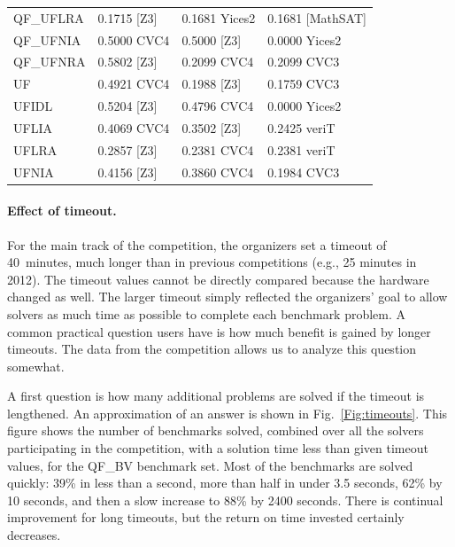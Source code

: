\documentclass[twoside,11pt]{article}
\begin{document}
\begin{table}
\begin{tabular}{|l|lll|}
QF\_UFLRA & 0.1715 [Z3] & 0.1681 Yices2 & 0.1681 [MathSAT] \\
QF\_UFNIA & 0.5000 CVC4 & 0.5000 [Z3] & 0.0000 Yices2 \\
QF\_UFNRA & 0.5802 [Z3] & 0.2099 CVC4 & 0.2099 CVC3 \\
UF & 0.4921 CVC4 & 0.1988 [Z3] & 0.1759 CVC3 \\
UFIDL & 0.5204 [Z3] & 0.4796 CVC4 & 0.0000 Yices2 \\
UFLIA & 0.4069 CVC4 & 0.3502 [Z3] & 0.2425 veriT \\
UFLRA & 0.2857 [Z3] & 0.2381 CVC4 & 0.2381 veriT \\
UFNIA & 0.4156 [Z3] & 0.3860 CVC4 & 0.1984 CVC3 \\
\hline
\end{tabular}
\end{table}

\paragraph{Effect of timeout.}
For the main track of the competition, the organizers set a timeout of 40~minutes, much longer than in previous competitions (e.g., 25 minutes in 2012).  The timeout values cannot be directly compared because the hardware changed as well. The larger timeout simply reflected the organizers' goal to allow solvers as much time as possible to complete each benchmark problem. A common practical question users have is how much benefit is gained by longer timeouts. The data from the competition allows us to analyze this question somewhat.

A first question is how many additional problems are solved if the timeout is lengthened. An approximation
of an answer is shown in Fig.~\ref{Fig:timeouts}. This figure shows the number of benchmarks solved, combined over all the solvers participating in the competition, with a solution time less than given timeout values, for the QF\_BV benchmark set.
Most of the benchmarks are solved quickly: 39\% in less than a second, more than half in under 3.5 seconds,
62\% by 10 seconds, and then a slow increase to 88\% by 2400 seconds. There is continual improvement for long timeouts, but the return on time invested certainly decreases.
\end{document}
